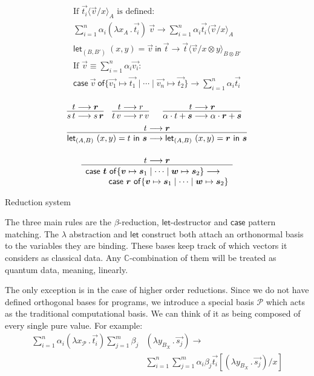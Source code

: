 \documentclass[runningheads,orivec]{llncs}
\newcommand\lra{\longrightarrow}
\newcommand\ansubst[2]{\ensuremath{\langle #1 \rangle_{#2}}}
\newcommand\AbsBasis{\ensuremath{\mathcal{P}}}
\def\C{\mathbb{C}}            %
\def\Pair#1#2{(#1,#2)} %
\def\Lam#1#2#3{\lambda#1_{#2}\,{.}\,#3} %
\def\letkeyword{\mathsf{let}}
\def\inkeyword{\mathsf{in}}
\def\LetP#1#2#3#4#5#6{\letkeyword_{\Pair{#2}{#4}}~\Pair{#1}{#3}=#5~\inkeyword~#6}
\def\gencase#1#2#3#4#5{\ensuremath{\mathsf{case}~#1~\mathsf{of} \{#2\mapsto #4 \mid \dotsb \mid #3\mapsto #5\}}}
\def\evalone{\rightarrow}
\newcommand\basis[1]{\ensuremath{B_{ #1 }}}
\begin{document}
\begin{table*}[tb]
  \small
  
  \[
  \begin{array}{l}
    \text{If }\vec{t_i}\ansubst{\vec v/x}{A}\text{ is defined:}\\[3pt]
    \sum_{i=1}^{n}\alpha_i(\Lam{x}{A}{\vec{t_i}})\ \vec{v} \evalone \sum_{i=1}^{n} \alpha_i \vec{t_i}\ansubst{\vec v/x}{A}\\[12pt]
    \LetP{x}{B}{y}{B'}{\vec v}{\vec{t}}\evalone\vec{t}\ansubst{\vec{v}/x\otimes y}{B\otimes B'}\\[12pt]
    \text{If }\vec{v}\equiv\sum_{i=1}^{n}\alpha_i \vec{v_i}:\\[3pt]
    \gencase{\vec{v}}{\vec{v_1}}{\vec{v_n}}{\vec{t_1}}{\vec{t_2}}\evalone\sum_{i=1}^{n}\alpha_i \vec{t_i}\\
  \end{array}
  \]
  
  \[
  \begin{array}{c c c}
    \infer{s\,t\lra s\,\vec r}{t\lra \vec r}
      &
      \infer{t\,v\lra r\,v}{t\lra r}
      &
      \infer{\alpha\cdot t+\vec s\lra\alpha\cdot\vec r+\vec s}{t\lra\vec r}\\[5pt]
      \multicolumn{3}{c}{
      \infer{\LetP{x}{A}{y}{B}{t}{\vec{s}}\lra \LetP{x}{A}{y}{B}{\vec r}{\vec{s}}}{t\lra \vec r}}
      \\[5pt]
  \end{array}
  \]

  \[
  \begin{array}{c}
      \infer
      {\begin{array}{c c}
        \gencase{\vec t}{\vec v}{\vec w}{\vec s_1}{\vec s_2}\lra&\\
        \multicolumn{2}{r}{\gencase{\vec r}{\vec v}{\vec w}{\vec s_1}{\vec s_2}}
      \end{array}
      }
      {t\lra \vec r}
  \end{array}
  \]
  \caption{Reduction system}
  \label{tab:Reduction}
\end{table*}

The three main rules are the $\beta$-reduction, $\mathsf{let}$-destructor and $\mathsf{case}$ pattern matching. The $\lambda$ abstraction and $\mathsf{let}$ construct both attach an orthonormal basis to the variables they are binding. These bases keep track of which vectors it considers as classical data. Any $\C$-combination of them will be treated as quantum data, meaning, linearly. 

The only exception is in the case of higher order reductions. Since we do not have defined orthogonal bases for programs, we introduce a special basis $\AbsBasis$ which acts as the traditional computational basis. We can think of it as being composed of every single pure value. For example:
\begin{align*}
  \sum_{i=1}^{n}\alpha_i(\Lam{x}{\AbsBasis}{\vec{t_i}}) \sum_{j=1}^{m}\beta_j&(\Lam{y}{\basis{X}}{\vec{s_j}}) \evalone\\
  &\sum_{i=1}^n\sum_{j=1}^{m}\alpha_i\beta_j \vec{t_i}[(\Lam{y}{\basis{X}}{\vec{s_j}})/x]
\end{align*}
\end{document}
